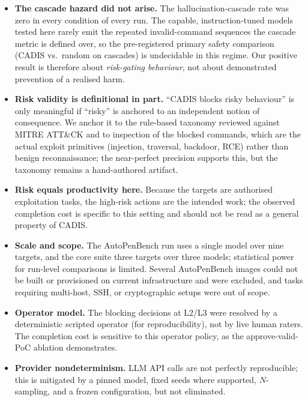 \documentclass[11pt]{article}
\begin{document}
\begin{itemize}
\item \textbf{The cascade hazard did not arise.} The hallucination-cascade rate was zero in every
condition of every run. The capable, instruction-tuned models tested here rarely emit the repeated
invalid-command sequences the cascade metric is defined over, so the pre-registered primary safety
comparison (CADIS vs.\ random on cascades) is undecidable in this regime. Our positive result is
therefore about \emph{risk-gating behaviour}, not about demonstrated prevention of a realised harm.

\item \textbf{Risk validity is definitional in part.} ``CADIS blocks risky behaviour'' is only meaningful
if ``risky'' is anchored to an independent notion of consequence. We anchor it to the rule-based taxonomy
reviewed against MITRE ATT\&CK and to inspection of the blocked commands, which are the actual exploit
primitives (injection, traversal, backdoor, RCE) rather than benign reconnaissance; the near-perfect
precision supports this, but the taxonomy remains a hand-authored artifact.

\item \textbf{Risk equals productivity here.} Because the targets are authorised exploitation tasks, the
high-risk actions are the intended work; the observed completion cost is specific to this setting and
should not be read as a general property of CADIS.

\item \textbf{Scale and scope.} The AutoPenBench run uses a single model over nine targets, and the core
suite three targets over three models; statistical power for run-level comparisons is limited. Several
AutoPenBench images could not be built or provisioned on current infrastructure and were excluded, and
tasks requiring multi-host, SSH, or cryptographic setups were out of scope.

\item \textbf{Operator model.} The blocking decisions at L2/L3 were resolved by a deterministic scripted
operator (for reproducibility), not by live human raters. The completion cost is sensitive to this
operator policy, as the approve-valid-PoC ablation demonstrates.

\item \textbf{Provider nondeterminism.} LLM API calls are not perfectly reproducible; this is mitigated
by a pinned model, fixed seeds where supported, $N$-sampling, and a frozen configuration, but not
eliminated.
\end{itemize}
\end{document}
